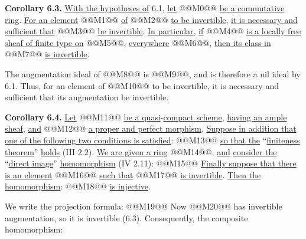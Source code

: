 \textbf{Corollary 6.3.} \uline{With the hypotheses of} 6.1, \uline{let} @@M0@@ \uline{be a commutative ring}. \uline{For an element} @@M1@@ \uline{of} @@M2@@ \uline{to be invertible}, \uline{it is necessary and sufficient that} @@M3@@ \uline{be invertible}. \uline{In particular}, \uline{if} @@M4@@ \uline{is a locally free sheaf of finite type on} @@M5@@, \uline{everywhere} @@M6@@, \uline{then its class in} @@M7@@ \uline{is invertible}.

The augmentation ideal of @@M8@@ is @@M9@@, and is therefore a nil ideal by 6.1. Thus, for an element of @@M10@@ to be invertible, it is necessary and sufficient that its augmentation be invertible.

\textbf{Corollary 6.4.} \uline{Let} @@M11@@ \uline{be a quasi}-\uline{compact scheme}, \uline{having an ample sheaf}, \uline{and} @@M12@@ \uline{a proper and perfect morphism}. \uline{Suppose in addition that one of the following two conditions is satisfied}:
@@M13@@
\uline{so that the} ``\uline{finiteness theorem}'' \uline{holds} (III 2.2). \uline{We are given a ring} @@M14@@, \uline{and} \uline{consider the} ``\uline{direct image}'' \uline{homomorphism} (IV 2.11):
@@M15@@
\uline{Finally suppose that there is an element} @@M16@@ \uline{such that} @@M17@@ \uline{is invertible}. \uline{Then the homomorphism}:
@@M18@@
\uline{is injective}.

We write the projection formula:
@@M19@@
Now @@M20@@ has invertible augmentation, so it is invertible (6.3). Consequently, the composite homomorphism:
